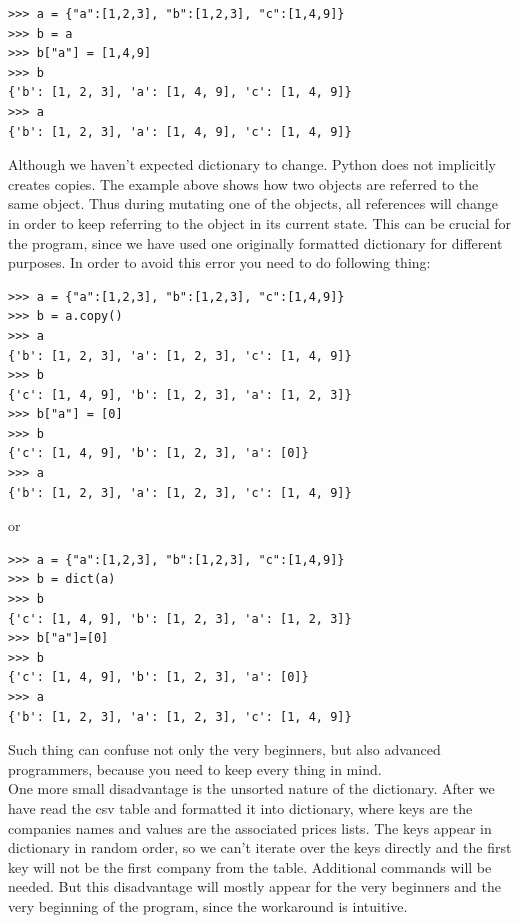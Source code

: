 \documentclass{article}
\begin{document}
\begin{verbatim}
>>> a = {"a":[1,2,3], "b":[1,2,3], "c":[1,4,9]}
>>> b = a
>>> b["a"] = [1,4,9]
>>> b
{'b': [1, 2, 3], 'a': [1, 4, 9], 'c': [1, 4, 9]}
>>> a
{'b': [1, 2, 3], 'a': [1, 4, 9], 'c': [1, 4, 9]}
\end{verbatim} 
Although we haven't expected dictionary to change. Python does not implicitly creates copies. The example above shows how two objects are referred to the same object. Thus during mutating one of the objects, all references will change in order to keep referring to the object in its current state. This can be crucial for the program, since we have used one originally formatted dictionary for different purposes. In order to avoid this error you need to do following thing:     
\begin{verbatim}
>>> a = {"a":[1,2,3], "b":[1,2,3], "c":[1,4,9]}
>>> b = a.copy()
>>> a
{'b': [1, 2, 3], 'a': [1, 2, 3], 'c': [1, 4, 9]}
>>> b
{'c': [1, 4, 9], 'b': [1, 2, 3], 'a': [1, 2, 3]}
>>> b["a"] = [0]
>>> b
{'c': [1, 4, 9], 'b': [1, 2, 3], 'a': [0]}
>>> a
{'b': [1, 2, 3], 'a': [1, 2, 3], 'c': [1, 4, 9]}
\end{verbatim}
or 
\begin{verbatim}
>>> a = {"a":[1,2,3], "b":[1,2,3], "c":[1,4,9]}
>>> b = dict(a)
>>> b
{'c': [1, 4, 9], 'b': [1, 2, 3], 'a': [1, 2, 3]}
>>> b["a"]=[0]
>>> b
{'c': [1, 4, 9], 'b': [1, 2, 3], 'a': [0]}
>>> a
{'b': [1, 2, 3], 'a': [1, 2, 3], 'c': [1, 4, 9]}
\end{verbatim}
Such thing can confuse not only the very beginners, but also advanced programmers, because you need to keep every thing in mind.\\
One more small disadvantage is the unsorted nature of the dictionary. After we have read the csv table and formatted it into dictionary, where keys are the companies names and values are the associated prices lists. The keys appear in dictionary in random order, so we can't iterate over the keys directly and the first key will not be the first company from the table. Additional commands will be needed. But this disadvantage will mostly appear for the very beginners and the very beginning of the program, since the workaround is intuitive. 
\end{document}
